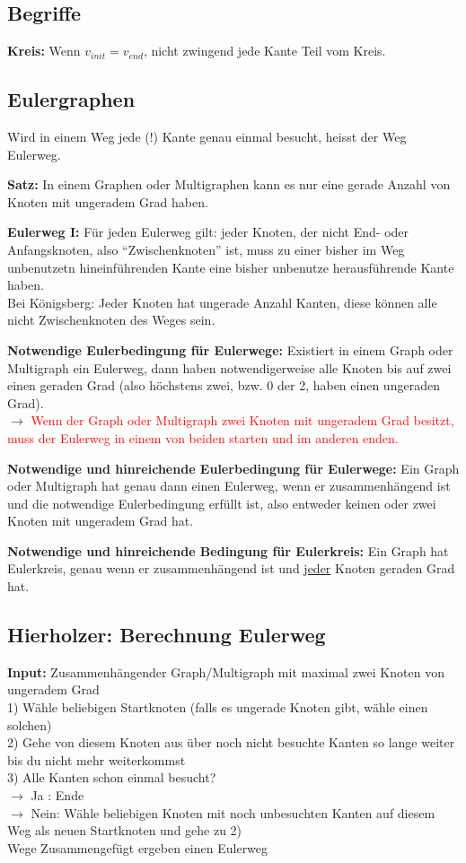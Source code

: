 \documentclass[8pt,landscape]{scrartcl}
\begin{document}
\begin{multicols}{3}
\subsection{Begriffe}
\textbf{Kreis:} Wenn $v_{init} = v_{end}$, nicht zwingend jede Kante Teil vom Kreis.

\subsection{Eulergraphen}
Wird in einem Weg jede (!) Kante genau einmal besucht, heisst der Weg Eulerweg.

\textbf{Satz:} In einem Graphen oder Multigraphen kann es nur eine gerade Anzahl von Knoten mit ungeradem Grad haben.

\textbf{Eulerweg I:} F\"ur jeden Eulerweg gilt: jeder Knoten, der nicht End- oder Anfangsknoten, also ``Zwischenknoten'' ist, muss zu einer bisher im Weg unbenutzetn hineinf\"uhrenden Kante eine bisher unbenutze herausf\"uhrende Kante haben.\\
Bei K\"onigsberg: Jeder Knoten hat ungerade Anzahl Kanten, diese k\"onnen alle nicht Zwischenknoten des Weges sein.

\textbf{Notwendige Eulerbedingung f\"ur Eulerwege:} Existiert in einem Graph oder Multigraph ein Eulerweg, dann haben notwendigerweise alle Knoten bis auf zwei einen geraden Grad (also h\"ochstens zwei, bzw. 0 der 2, haben einen ungeraden Grad).\\
$\rightarrow$ \textcolor{red}{Wenn der Graph oder Multigraph zwei Knoten mit ungeradem Grad besitzt, muss der Eulerweg in einem von beiden starten und im anderen enden.}

\textbf{Notwendige und hinreichende Eulerbedingung f\"ur Eulerwege:} Ein Graph oder Multigraph hat genau dann einen Eulerweg, wenn er zusammenh\"angend ist und die notwendige Eulerbedingung erf\"ullt ist, also entweder keinen oder zwei Knoten mit ungeradem Grad hat.

\textbf{Notwendige und hinreichende Bedingung f\"ur Eulerkreis:} Ein Graph hat Eulerkreis, genau wenn er zusammenh\"angend ist und \underline{jeder} Knoten geraden Grad hat.



\subsection{Hierholzer: Berechnung Eulerweg}
\textbf{Input:} Zusammenh\"angender Graph/Multigraph mit maximal zwei Knoten von ungeradem Grad\\
1) W\"ahle beliebigen Startknoten (falls es ungerade Knoten gibt, w\"ahle einen solchen)\\
2) Gehe von diesem Knoten aus \"uber noch nicht besuchte Kanten so lange weiter bis du nicht mehr weiterkommst\\
3) Alle Kanten schon einmal besucht?\\
$\rightarrow$ Ja : Ende\\
$\rightarrow$ Nein: W\"ahle beliebigen Knoten mit noch unbesuchten Kanten auf diesem Weg als neuen Startknoten und gehe zu 2)\\
Wege Zusammengef\"ugt ergeben einen Eulerweg


\end{multicols}
\end{document}

